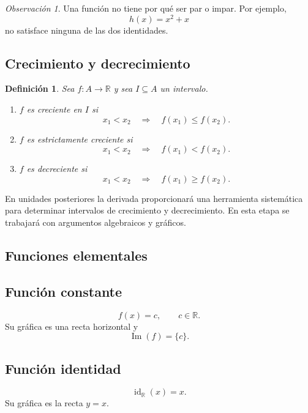 \documentclass[12pt]{article}
\newtheorem{definicion}{Definición}[section]
\theoremstyle{remark}
\newtheorem{observacion}{Observación}[section]
\newcommand{\R}{\mathbb{R}}
\newcommand{\Ima}{\operatorname{Im}}
\newcommand{\id}{\operatorname{id}}
\begin{document}
\begin{observacion}
Una función no tiene por qué ser par o impar. Por ejemplo,
\[
h(x)=x^2+x
\]
no satisface ninguna de las dos identidades.
\end{observacion}

\subsection*{Crecimiento y decrecimiento}

\begin{definicion}
Sea $f:A\to\R$ y sea $I\subseteq A$ un intervalo.

\begin{enumerate}
    \item $f$ es \emph{creciente} en $I$ si
    \[
    x_1<x_2\quad\Longrightarrow\quad f(x_1)\leq f(x_2).
    \]
    \item $f$ es \emph{estrictamente creciente} si
    \[
    x_1<x_2\quad\Longrightarrow\quad f(x_1)<f(x_2).
    \]
    \item $f$ es \emph{decreciente} si
    \[
    x_1<x_2\quad\Longrightarrow\quad f(x_1)\geq f(x_2).
    \]
\end{enumerate}
\end{definicion}

En unidades posteriores la derivada proporcionará una herramienta sistemática
para determinar intervalos de crecimiento y decrecimiento. En esta etapa se
trabajará con argumentos algebraicos y gráficos.

\subsection*{Funciones elementales}
\subsection*{Función constante}

\[
f(x)=c,\qquad c\in\R.
\]
Su gráfica es una recta horizontal y
\[
\Ima(f)=\{c\}.
\]

\subsection*{Función identidad}

\[
\id_{\R}(x)=x.
\]
Su gráfica es la recta $y=x$.
\end{document}
